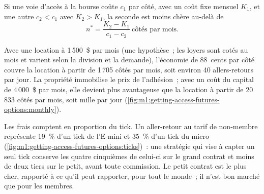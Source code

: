 \begin{proposition}\label{prop:m1:getting-access-futures-options:breakeven}
Si une voie d'accès à la bourse coûte $c_1$ par côté, avec un coût fixe mensuel $K_1$,
et une autre $c_2 < c_1$ avec $K_2 > K_1$, la seconde est moins chère au-delà de
\[
n^* = \frac{K_2 - K_1}{c_1 - c_2}\ \text{côtés par mois.}
\]
\end{proposition}

Avec une location à 1\,500~\$ par mois (une hypothèse~; les loyers sont cotés au mois et
varient selon la division et la demande), l'économie de 88~cents par côté couvre la
location à partir de 1\,705 côtés par mois, soit environ 40 allers-retours par jour. La propriété immobilise
le prix de l'adhésion~; avec un coût du capital de 4\,000~\$ par mois, elle devient plus avantageuse que la
location à partir de 20\,833 côtés par mois, soit mille par jour
(\cref{fig:m1:getting-access-futures-options:monthly}).

\begin{omfigure}

\label{fig:m1:getting-access-futures-options:monthly}
\end{omfigure}

Les frais comptent en proportion du tick. Un aller-retour au tarif de non-membre
représente 19~\% d'un tick de l'E-mini et 35~\% d'un tick du micro
(\cref{fig:m1:getting-access-futures-options:ticks})~: une stratégie qui vise à capter un seul tick
conserve les quatre cinquièmes de celui-ci sur le grand contrat et moins de deux
tiers sur le petit, avant toute commission. Le petit contrat est le
plus cher, rapporté à ce qu'il peut rapporter, pour tout le monde~; il n'est bon marché que pour
les membres.

